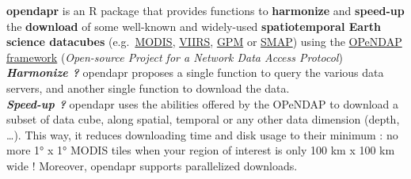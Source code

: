 \documentclass[12pt,twoside]{reedthesis}
\begin{document}
\textbf{opendapr} is an R package that provides functions to \textbf{harmonize} and \textbf{speed-up} the \textbf{download} of some well-known and widely-used \textbf{spatiotemporal Earth science datacubes} (e.g.~\href{https://lpdaac.usgs.gov/data/get-started-data/collection-overview/missions/modis-overview/}{MODIS}, \href{https://lpdaac.usgs.gov/data/get-started-data/collection-overview/missions/s-npp-nasa-viirs-overview/}{VIIRS}, \href{https://pmm.nasa.gov/GPM}{GPM} or \href{https://smap.jpl.nasa.gov/}{SMAP}) using the \href{https://www.opendap.org/about}{OPeNDAP framework} (\emph{Open-source Project for a Network Data Access Protocol})\\

\textbf{\emph{Harmonize ?}} opendapr proposes a single function to query the various data servers, and another single function to download the data.\\

\textbf{\emph{Speed-up ?}} opendapr uses the abilities offered by the OPeNDAP to download a subset of data cube, along spatial, temporal or any other data dimension (depth, \ldots). This way, it reduces downloading time and disk usage to their minimum : no more 1° x 1° MODIS tiles when your region of interest is only 100 km x 100 km wide !
Moreover, opendapr supports parallelized downloads.\\
\end{document}
